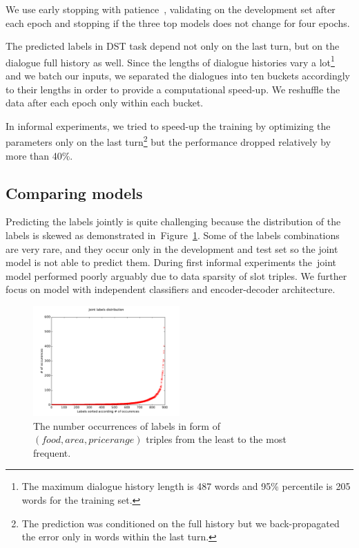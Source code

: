 \documentclass{itatnew}
\def\OD#1{{\color{darkgreen}OD: \it #1}}
\begin{document}
We use early stopping with patience~\cite{prechelt1998early}, validating on the development set after each epoch and stopping if the three top models does not change for four epochs.

The predicted labels in DST task depend not only on the last turn, but on the dialogue full history as well.
Since the lengths of dialogue histories vary a lot\footnote{The maximum dialogue history length is 487 words and 95\% percentile is 205 words for the training set.} and we batch our inputs, we separated the dialogues into ten buckets accordingly to their lengths in order to provide a computational speed-up. We reshuffle the data after each epoch only within each bucket.

In informal experiments, we tried to speed-up the training by  optimizing the parameters only on the last turn\footnote{The prediction was conditioned on the full history but we back-propagated the error only in words within the last turn.} but the performance dropped relatively by more than 40\%.

\subsection{Comparing models}
\label{sec:eval}

Predicting the labels jointly is quite challenging because the distribution of the labels is skewed as demonstrated in~Figure~\ref{fig:labels}.
Some of the labels combinations are very rare, and they occur only in the development and test set so the joint model is not able to predict them.
During first informal experiments the~joint model performed poorly arguably due to data sparsity of slot triples. We further focus on model with independent classifiers and encoder-decoder architecture.

\begin{figure}
\includegraphics[width=0.5\textwidth]{jointLabelsDistrib}
\caption{The number occurrences of labels in form of $(food, area, pricerange)$ triples from the least to the most frequent.}
\label{fig:labels}
\end{figure}
\end{document}
